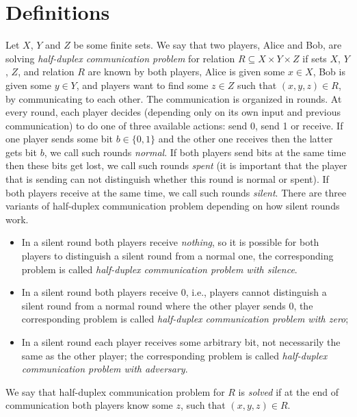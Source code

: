 \section{Definitions}\label{sec:defs}
\begin{definition}
Let $X$, $Y$ and $Z$ be some finite sets. We say that two players, Alice and Bob, are solving
\emph{half-duplex communication problem} for relation $R \subseteq X\times Y\times Z$ if sets $X$, $Y$, $Z$, and
relation $R$ are known by both players, Alice is given some $x\in X$, Bob is given some $y\in Y$,
and players want to find some $z\in Z$ such that $(x,y,z)\in R$, by communicating to each other. 
The communication is organized in rounds. At every round, each player decides 
(depending only on its own input and previous communication) to
do one of three available actions: send 0, send 1 or receive.
If one player sends some bit $b\in\{0,1\}$ and the other one receives then the latter gets bit $b$, we
call such rounds \emph{normal}.
If both players send bits at the same time then these bits get lost, we call such rounds
\emph{spent} (it is important that the player that is sending can not distinguish whether this round
is normal or spent).
If both players receive at the same time, we call such rounds \emph{silent}.
There are three variants of half-duplex communication problem depending
on how silent rounds work.
\begin{itemize}
\item In a silent round both players receive \emph{nothing}, so it is possible for both players to distinguish
    a silent round from a normal one, the corresponding problem is called \emph{half-duplex communication problem with silence}.

\item In a silent round both players receive $0$, i.e., players cannot distinguish a silent round from a normal round where the other player sends $0$, the corresponding problem is called 
\emph{half-duplex communication problem with zero};

\item In a silent round each player receives some arbitrary bit, not necessarily the same as the other player; the corresponding problem is called \emph{half-duplex communication problem with adversary}.
\end{itemize}
We say that half-duplex communication problem for $R$ is \emph{solved} if at the end of communication both players know some $z$, such that $(x,y,z)\in R$.
\end{definition} 

